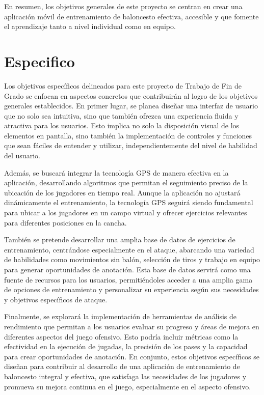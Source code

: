 En resumen, los objetivos generales de este proyecto se centran en crear una aplicación móvil de entrenamiento de baloncesto efectiva, accesible y que fomente el aprendizaje tanto a nivel individual como en equipo.

\section{Especifico}

Los objetivos específicos delineados para este proyecto de Trabajo de Fin de Grado se enfocan en aspectos concretos que contribuirán al logro de los objetivos generales establecidos. En primer lugar, se planea diseñar una interfaz de usuario que no solo sea intuitiva, sino que también ofrezca una experiencia fluida y atractiva para los usuarios. Esto implica no solo la disposición visual de los elementos en pantalla, sino también la implementación de controles y funciones que sean fáciles de entender y utilizar, independientemente del nivel de habilidad del usuario.

Además, se buscará integrar la tecnología GPS de manera efectiva en la aplicación, desarrollando algoritmos que permitan el seguimiento preciso de la ubicación de los jugadores en tiempo real. Aunque la aplicación no ajustará dinámicamente el entrenamiento, la tecnología GPS seguirá siendo fundamental para ubicar a los jugadores en un campo virtual y ofrecer ejercicios relevantes para diferentes posiciones en la cancha.

También se pretende desarrollar una amplia base de datos de ejercicios de entrenamiento, centrándose especialmente en el ataque, abarcando una variedad de habilidades como movimientos sin balón, selección de tiros y trabajo en equipo para generar oportunidades de anotación. Esta base de datos servirá como una fuente de recursos para los usuarios, permitiéndoles acceder a una amplia gama de opciones de entrenamiento y personalizar su experiencia según sus necesidades y objetivos específicos de ataque.

Finalmente, se explorará la implementación de herramientas de análisis de rendimiento que permitan a los usuarios evaluar su progreso y áreas de mejora en diferentes aspectos del juego ofensivo. Esto podría incluir métricas como la efectividad en la ejecución de jugadas, la precisión de los pases y la capacidad para crear oportunidades de anotación. En conjunto, estos objetivos específicos se diseñan para contribuir al desarrollo de una aplicación de entrenamiento de baloncesto integral y efectiva, que satisfaga las necesidades de los jugadores y promueva su mejora continua en el juego, especialmente en el aspecto ofensivo.